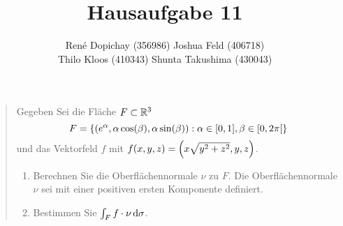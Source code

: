 \documentclass{exercise}
\title{Hausaufgabe 11}
\author{René Dopichay (356986) \quad Joshua Feld (406718)\\Thilo Kloos (410343) \quad Shunta Takushima (430043)}
\begin{document}
	\maketitle


	\section{}

	\begin{quote}
		Gegeben Sei die Fläche \(F \subset \mathbb{R}^3\)
		\[
			F = \braces*{\parentheses*{e^\alpha, \alpha\cos\parentheses*{\beta}, \alpha\sin\parentheses*{\beta}} : \alpha \in \brackets*{0, 1}, \beta \in \left[0, 2\pi\right[}
		\]
		und das Vektorfeld \(f\) mit \(f\parentheses*{x, y, z} = \parentheses*{x\sqrt{y^2 + z^2}, y, z}\).
		\begin{enumerate}
			\item Berechnen Sie die Oberflächennormale \(\nu\) zu \(F\).
			Die Oberflächennormale \(\nu\) sei mit einer positiven ersten Komponente definiert.
			\item Bestimmen Sie \(\int_F f \cdot \nu\mathop{\mathrm{d}\!}\sigma\).
		\end{enumerate}
	\end{quote}
\end{document}
